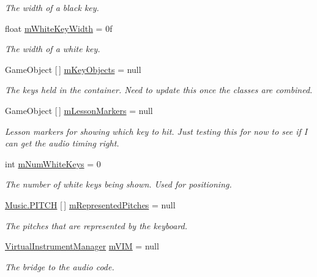\begin{DoxyCompactItemize}
\begin{DoxyCompactList}\small\item\em The width of a black key. \end{DoxyCompactList}\item 
float \hyperlink{group___key_contain_priv_var_gae5b8787a5242834f99ad8072e7ea6004}{m\+White\+Key\+Width} = 0f
\begin{DoxyCompactList}\small\item\em The width of a white key. \end{DoxyCompactList}\item 
Game\+Object \mbox{[}$\,$\mbox{]} \hyperlink{group___key_contain_priv_var_ga01addf187bb12ffe824374df98e2c2d8}{m\+Key\+Objects} = null
\begin{DoxyCompactList}\small\item\em The keys held in the container. Need to update this once the classes are combined. \end{DoxyCompactList}\item 
Game\+Object \mbox{[}$\,$\mbox{]} \hyperlink{group___key_contain_priv_var_gaf21490115ecf2b80c1bd382d7469a08c}{m\+Lesson\+Markers} = null
\begin{DoxyCompactList}\small\item\em Lesson markers for showing which key to hit. Just testing this for now to see if I can get the audio timing right. \end{DoxyCompactList}\item 
int \hyperlink{group___key_contain_priv_var_ga7a5547a1fe5c40eac487fe6c826c8f9c}{m\+Num\+White\+Keys} = 0
\begin{DoxyCompactList}\small\item\em The number of white keys being shown. Used for positioning. \end{DoxyCompactList}\item 
\hyperlink{group___music_enums_ga508f69b199ea518f935486c990edac1d}{Music.\+P\+I\+T\+CH} \mbox{[}$\,$\mbox{]} \hyperlink{group___key_contain_priv_var_ga103945a6efe3469191e5253d13fec5be}{m\+Represented\+Pitches} = null
\begin{DoxyCompactList}\small\item\em The pitches that are represented by the keyboard. \end{DoxyCompactList}\item 
\hyperlink{class_virtual_instrument_manager}{Virtual\+Instrument\+Manager} \hyperlink{group___key_contain_priv_var_ga57ee3824e2f284403bb70ad9c4dfd307}{m\+V\+IM} = null
\begin{DoxyCompactList}\small\item\em The bridge to the audio code. \end{DoxyCompactList}\end{DoxyCompactItemize}


